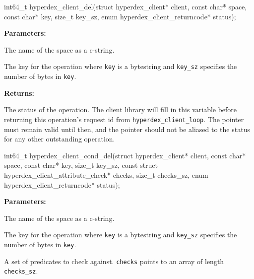 \funcsep
{}
\begin{ccode}
int64_t hyperdex_client_del(struct hyperdex_client* client,
                const char* space,
                const char* key, size_t key_sz,
                enum hyperdex_client_returncode* status);
\end{ccode}
\funcdesc 

\noindent\textbf{Parameters:}
\begin{description}[labelindent=\widthof{{\texttt{key}, \texttt{key\_sz}}},leftmargin=*,noitemsep,nolistsep,align=right]
\item[\texttt{space}] The name of the space as a c-string.
\item[\texttt{key}, \texttt{key\_sz}] The key for the operation where \texttt{key} is a bytestring and \texttt{key\_sz} specifies the number of bytes in \texttt{key}.
\end{description}

\noindent\textbf{Returns:}
\begin{description}[labelindent=\widthof{{\texttt{status}}},leftmargin=*,noitemsep,nolistsep,align=right]
\item[\texttt{status}] The status of the operation.  The client library will fill in this variable before returning this operation's request id from \texttt{hyperdex\_client\_loop}.  The pointer must remain valid until then, and the pointer should not be aliased to the status for any other outstanding operation.
\end{description}

\funcsep
{}
\begin{ccode}
int64_t hyperdex_client_cond_del(struct hyperdex_client* client,
                const char* space,
                const char* key, size_t key_sz,
                const struct hyperdex_client_attribute_check* checks, size_t checks_sz,
                enum hyperdex_client_returncode* status);
\end{ccode}
\funcdesc 

\noindent\textbf{Parameters:}
\begin{description}[labelindent=\widthof{{\texttt{checks}, \texttt{checks\_sz}}},leftmargin=*,noitemsep,nolistsep,align=right]
\item[\texttt{space}] The name of the space as a c-string.
\item[\texttt{key}, \texttt{key\_sz}] The key for the operation where \texttt{key} is a bytestring and \texttt{key\_sz} specifies the number of bytes in \texttt{key}.
\item[\texttt{checks}, \texttt{checks\_sz}] A set of predicates to check against.  \texttt{checks} points to an array of length \texttt{checks\_sz}.
\end{description}

